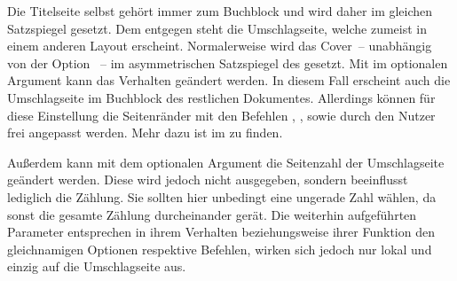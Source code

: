 \begin{Declaration*}{}
\begin{Declaration*}{}
\begin{Declaration*}{}
\begin{Declaration}
\begin{Declaration}[v2.02]{%
}
\begin{Declaration}{}
\begin{Declaration}[v2.02]{}{%
}
\begin{Declaration}[v2.03]{}{%
}
\begin{Declaration}[v2.03]{}{%
}
\begin{Declaration}[v2.03]{%
}{}
\begin{Declaration}[v2.03]{%
}{}
\begin{Declaration}[v2.03]{}{%
}
\begin{Declaration}[v2.03]{}{%
}
\begin{Declaration}[v2.03]{}{%
}
Die Titelseite selbst gehört immer zum Buchblock und wird daher im gleichen 
Satzspiegel gesetzt. Dem entgegen steht die Umschlagseite, welche zumeist in 
einem anderen Layout erscheint. Normalerweise wird das Cover~-- unabhängig von 
der Option ~-- im asymmetrischen Satzspiegel des \CDs 
gesetzt. Mit  im optionalen Argument 
kann das Verhalten geändert werden. In diesem Fall erscheint auch die 
Umschlagseite im Buchblock des restlichen Dokumentes. Allerdings können für 
diese Einstellung die Seitenränder mit den Befehlen , 
,  sowie 
 durch den Nutzer frei angepasst werden. Mehr dazu 
ist im \scrguide zu finden.

Außerdem kann mit dem optionalen Argument die Seitenzahl der Umschlagseite 
geändert werden. Diese wird jedoch nicht ausgegeben, sondern beeinflusst 
lediglich die Zählung. Sie sollten hier unbedingt eine ungerade Zahl wählen, da 
sonst die gesamte Zählung durcheinander gerät. Die weiterhin aufgeführten 
Parameter entsprechen in ihrem Verhalten beziehungsweise ihrer Funktion den 
gleichnamigen Optionen respektive Befehlen, wirken sich jedoch nur lokal und 
einzig auf die Umschlagseite aus.
%
\end{Declaration}
\end{Declaration}
\end{Declaration}
\end{Declaration}
\end{Declaration}
\end{Declaration}
\end{Declaration}
\end{Declaration}
\end{Declaration}
\end{Declaration}
\end{Declaration}


\end{Declaration*}
\end{Declaration*}
\end{Declaration*}
